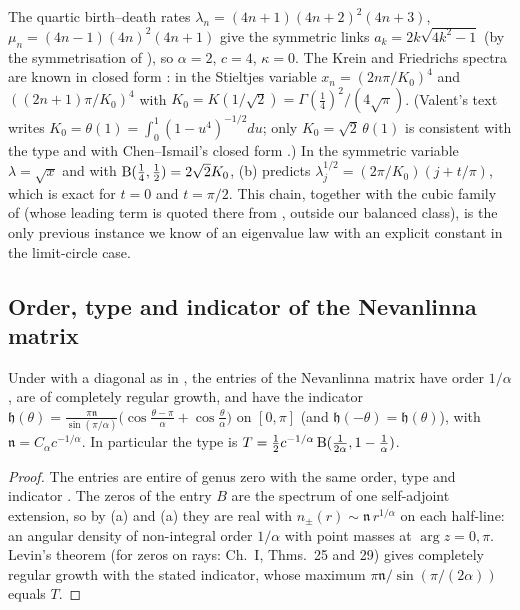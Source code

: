 \begin{example}\label{ex:bv}
The quartic birth--death rates $\lambda_n=(4n+1)(4n+2)^2(4n+3)$, $\mu_n=(4n-1)(4n)^2(4n+1)$
give the symmetric links $a_k=2k\sqrt{4k^2-1}$ (by the symmetrisation of
), so $\alpha=2$, $c=4$, $\kappa=0$. The Krein and Friedrichs spectra are known in
closed form \cite{BergValent1994,Valent2006}: in the Stieltjes variable
$x_n=(2n\pi/K_0)^4$ and $((2n+1)\pi/K_0)^4$ with $K_0=K(1/\sqrt2)=\Gamma(\tfrac14)^2/(4\sqrt\pi)$.
(Valent's text \cite{Valent2006} writes $K_0=\theta(1)=\int_0^1(1-u^4)^{-1/2}du$; only
$K_0=\sqrt2\,\theta(1)$ is consistent with the type and with Chen--Ismail's closed form
\cite{BergChenIsmail}.) In the symmetric variable $\lambda=\sqrt x$ and with
$\operatorname{B}(\frac14,\frac12)=2\sqrt2K_0$, (b) predicts
$\lambda_j^{1/2}=(2\pi/K_0)(j+t/\pi)$, which is exact for $t=0$ and $t=\pi/2$. This chain,
together with the cubic family of \cite[Remark 3 after Prop.~14]{GLRV2006} (whose leading
term is quoted there from \cite{GLV2005}, outside our balanced class), is the only previous
instance we know of an eigenvalue law with an explicit constant in the limit-circle
case.
\end{example}

\subsection{Order, type and indicator of the Nevanlinna matrix}

\begin{corollary}\label{cor:type}
Under  with a diagonal as in , the entries of the Nevanlinna
matrix have order $1/\alpha$, are of completely regular growth, and have the indicator
$\mathfrak h(\theta)=\frac{\pi\mathfrak n}{\sin(\pi/\alpha)}\bigl(\cos\frac{\theta-\pi}{\alpha}+\cos\frac\theta\alpha\bigr)$ on
$[0,\pi]$ (and $\mathfrak h(-\theta)=\mathfrak h(\theta)$), with $\mathfrak n=C_\alpha c^{-1/\alpha}$. In particular the type is
$T=\frac12c^{-1/\alpha}\operatorname{B}(\frac1{2\alpha},1-\frac1\alpha)$.
\end{corollary}

\begin{proof}
The entries are entire of genus zero with the same order, type and indicator
\cite{BergPedersen1994}. The zeros of the entry $B$ are the spectrum of one self-adjoint
extension, so by (a) and (a) they are real with
$n_\pm(r)\sim\mathfrak n\,r^{1/\alpha}$ on each half-line: an angular density of non-integral order
$1/\alpha$ with point masses at $\arg z=0,\pi$. Levin's theorem \cite[Ch.~II \S1,
Thm.~1]{Levin1964} (for zeros on rays: Ch.~I, Thms.~25 and 29) gives completely regular
growth with the stated indicator, whose maximum $\pi\mathfrak n/\sin(\pi/(2\alpha))$ equals $T$.
\end{proof}

